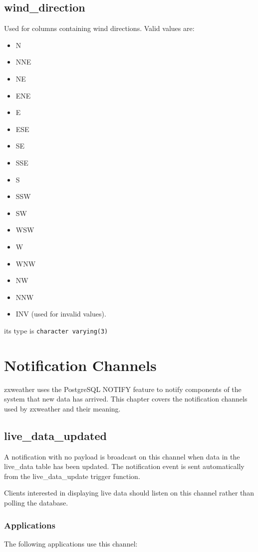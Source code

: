 \documentclass[a4paper,10pt]{book}
\begin{document}
\section{wind\_direction}
\label{wind_direction}

Used for columns containing wind directions. Valid values are:
\begin{itemize}
\item N
\item NNE
\item NE
\item ENE
\item E
\item ESE
\item SE
\item SSE
\item S
\item SSW
\item SW
\item WSW
\item W
\item WNW
\item NW
\item NNW
\item INV (used for invalid values).
\end{itemize}

its type is \verb|character varying(3)|


\chapter{Notification Channels}
\label{cha_notify}

zxweather uses the PostgreSQL NOTIFY feature to notify components of the system that new data has arrived. This chapter covers the notification channels used by zxweather and their meaning.

\section{live\_data\_updated}
A notification with no payload is broadcast on this channel when data in the live\_data table has been updated. The notification event is sent automatically from the live\_data\_update trigger function.

Clients interested in displaying live data should listen on this channel rather than polling the database.

\subsection{Applications}
The following applications use this channel:
\end{document}
